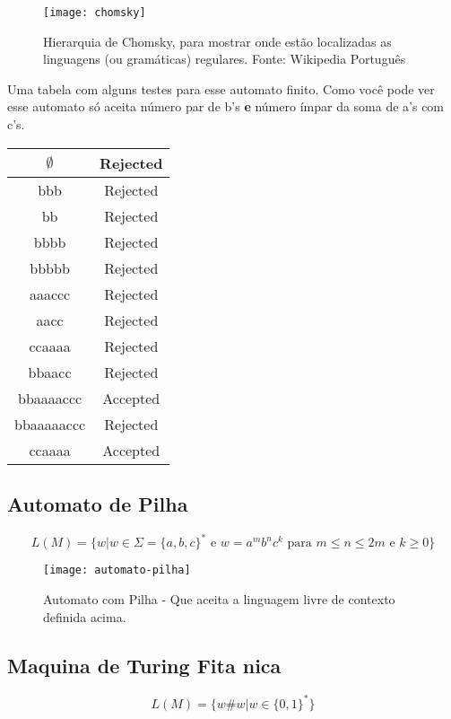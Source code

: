 \documentclass[12pt, a4paper]{article}
\begin{document}
\begin{figure}[ht]
\centering
\texttt{[image: chomsky]}
\caption{Hierarquia de Chomsky, para mostrar onde estão localizadas as linguagens (ou gramáticas) regulares. Fonte: Wikipedia Português}
\end{figure}


\qquad Uma tabela com alguns testes para esse automato finito. Como você pode ver esse automato só aceita número par de b's \textbf{e} número ímpar da soma de a's com c's.

\begin{tabular}{|c|c|}
\hline
$\emptyset$ & Rejected \\
\hline
bbb & Rejected \\
\hline
bb & Rejected \\
\hline
bbbb & Rejected \\
\hline
bbbbb & Rejected \\
\hline
aaaccc & Rejected \\
\hline
aacc & Rejected \\
\hline
ccaaaa & Rejected \\
\hline
bbaacc & Rejected \\
\hline
bbaaaaccc & Accepted \\
\hline
bbaaaaaccc & Rejected \\
\hline
ccaaaa & Accepted \\
\hline
\end{tabular}

\pagebreak
\subsection{Automato de Pilha}

$$ L(M)= \lbrace w \vert w \in \Sigma =  {\lbrace a,b,c \rbrace}^* \text{ e } w = {{a}^m}{{b}^n}{{c}^k} \text{ para } m \leqslant n  \leqslant 2m \text{ e } k \geqslant 0 \rbrace $$


\begin{figure}[ht]
\centering
\texttt{[image: automato-pilha]}
\caption{Automato com Pilha - Que aceita a linguagem livre de contexto definida acima.}
\end{figure}

\pagebreak
\subsection{Maquina de Turing Fita nica}

$$ L(M)= \lbrace w \# w \vert w \in  {\lbrace 0,1 \rbrace}^* \rbrace $$
\end{document}
